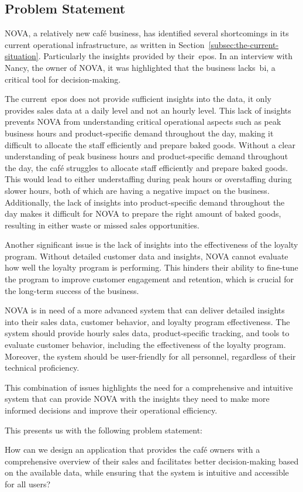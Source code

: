\subsection{Problem Statement}\label{subsec:problem-statement}

NOVA, a relatively new café business, has identified several shortcomings in its current operational infrastructure,
as written in Section~\ref{subsec:the-current-situation}.
Particularly the insights provided by their~\acrfull{epos}.
In an interview with Nancy, the owner of NOVA, it was highlighted that the business lacks~\acrfull{bi}, a critical tool
for decision-making.

The current~\acrshort{epos} does not provide sufficient insights into the data, it only provides sales data at a daily
level and not an hourly level.
This lack of insights prevents NOVA from understanding critical operational aspects such as peak business hours and
product-specific demand throughout the day, making it difficult to allocate the staff efficiently and prepare baked
goods.
Without a clear understanding of peak business hours and product-specific demand throughout the day, the café struggles
to allocate staff efficiently and prepare baked goods.
This would lead to either understaffing during peak hours or overstaffing during slower hours, both of which are
having a negative impact on the business.
Additionally, the lack of insights into product-specific demand throughout the day makes it difficult for NOVA to
prepare the right amount of baked goods, resulting in either waste or missed sales opportunities.

Another significant issue is the lack of insights into the effectiveness of the loyalty program.
Without detailed customer data and insights, NOVA cannot evaluate how well the loyalty program is performing.
This hinders their ability to fine-tune the program to improve customer engagement and retention, which is crucial for
the long-term success of the business.

NOVA is in need of a more advanced system that can deliver detailed insights into their sales data, customer behavior,
and loyalty program effectiveness.
The system should provide hourly sales data, product-specific tracking, and tools to evaluate customer behavior,
including the effectiveness of the loyalty program.
Moreover, the system should be user-friendly for all personnel, regardless of their technical proficiency.

This combination of issues highlights the need for a comprehensive and intuitive system that can provide NOVA with the
insights they need to make more informed decisions and improve their operational efficiency.

This presents us with the following problem statement:

\begin{tcolorbox}[title=Problem statement]
    How can we design an application that provides the café owners with a comprehensive overview of their sales and
    facilitates better decision-making based on the available data, while ensuring that the system is intuitive and
    accessible for all users?
\end{tcolorbox}
